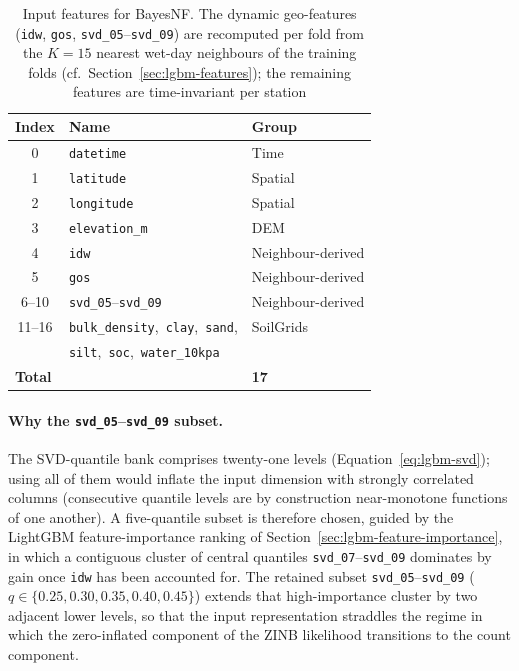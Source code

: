 \begin{table}[ht]
  \centering
  \caption{Input features for BayesNF. The dynamic geo-features
  (\texttt{idw}, \texttt{gos}, \texttt{svd\_05}--\texttt{svd\_09}) are
  recomputed per fold from the $K = 15$ nearest wet-day neighbours of
  the training folds (cf.\ Section~\ref{sec:lgbm-features}); the
  remaining features are time-invariant per station}
  \label{tab:bnf-features}
  \begin{tabular}{c l l}
    \toprule
    Index & Name                  & Group                   \\
    \midrule
    0     & \texttt{datetime}     & Time               \\
    1     & \texttt{latitude}     & Spatial            \\
    2     & \texttt{longitude}    & Spatial            \\
    3     & \texttt{elevation\_m} & DEM                \\
    4     & \texttt{idw}          & Neighbour-derived  \\
    5     & \texttt{gos}          & Neighbour-derived  \\
    6--10 & \texttt{svd\_05}--\texttt{svd\_09}
                                  & Neighbour-derived  \\
    11--16 & \texttt{bulk\_density},\ \texttt{clay},\ \texttt{sand},
                                  & SoilGrids          \\
           & \texttt{silt},\ \texttt{soc},\ \texttt{water\_10kpa}
                                  &                    \\
    \midrule
    \multicolumn{2}{l}{\textbf{Total}} & \multicolumn{1}{l}{\textbf{17}} \\
    \bottomrule
  \end{tabular}
\end{table}

\paragraph{Why the \texttt{svd\_05}--\texttt{svd\_09} subset.} The
SVD-quantile bank comprises twenty-one levels
(Equation~\eqref{eq:lgbm-svd}); using all of them would inflate the
input dimension with strongly correlated columns (consecutive quantile
levels are by construction near-monotone functions of one another). A
five-quantile subset is
therefore chosen, guided by the LightGBM feature-importance ranking of
Section~\ref{sec:lgbm-feature-importance}, in which a contiguous
cluster of central quantiles \texttt{svd\_07}--\texttt{svd\_09}
dominates by gain once \texttt{idw} has been accounted for. The
retained subset \texttt{svd\_05}--\texttt{svd\_09} ($q \in \{0{.}25,
0{.}30, 0{.}35, 0{.}40, 0{.}45\}$) extends that high-importance cluster
by two adjacent lower levels, so that the input representation
straddles the regime in which the zero-inflated component of the ZINB
likelihood transitions to the count component.

